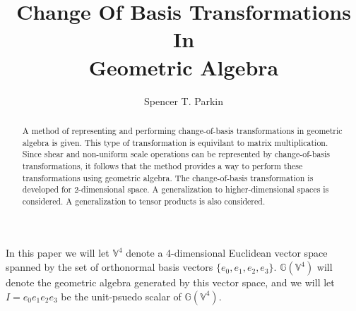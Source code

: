 \documentclass[12pt]{article}
\title{Change Of Basis Transformations\\In\\Geometric Algebra}
\author{Spencer T. Parkin}
\newcommand{\G}{\mathbb{G}}
\newcommand{\V}{\mathbb{V}}
\begin{document}
\maketitle

\begin{abstract}
A method of representing and performing change-of-basis transformations in geometric algebra is given.
This type of transformation is equivilant to matrix multiplication.  Since shear and non-uniform scale
operations can be represented by change-of-basis transformations, it follows that the method provides
a way to perform these transformations using geometric algebra.  The change-of-basis transformation is
developed for 2-dimensional space.  A generalization to higher-dimensional spaces is considered.  A
generalization to tensor products is also considered.
\end{abstract}

In this paper we will let $\V^4$ denote a 4-dimensional Euclidean vector space spanned by
the set of orthonormal basis vectors $\{e_0,e_1,e_2,e_3\}$.  $\G(\V^4)$ will denote the
geometric algebra generated by this vector space, and we will let $I=e_0e_1e_2e_3$ be
the unit-psuedo scalar of $\G(\V^4)$.
\end{document}
